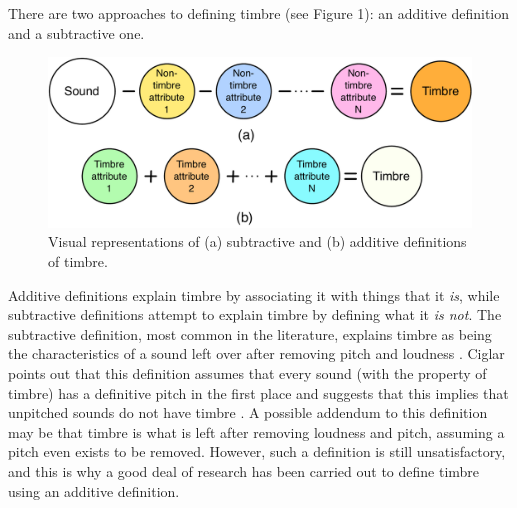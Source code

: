 \documentclass[12pt]{report} 	%
\numberwithin{figure}{chapter}
\numberwithin{table}{chapter}
\numberwithin{equation}{chapter}
\begin{document}
\begin{flushleft}
There are two approaches to defining timbre (see Figure 1): an additive definition and a subtractive one. 
\begin{figure}[!htp]
\begin{center}
\includegraphics[scale=0.45]{SubtractiveVsAdditive}
\caption[Subtractive vs. additive timbre definitions]{Visual representations of (a) subtractive and (b) additive definitions of timbre.}
\end{center}
\vspace{6pt}
\end{figure}
Additive definitions explain timbre by associating it with things that it \textit{is}, while subtractive definitions attempt to explain timbre by defining what it \textit{is not}. The subtractive definition, most common in the literature, explains timbre as being the characteristics of a sound left over after removing pitch and loudness \cite[p. 45]{Wessel:1979tg} \cite[p. 225]{Toiviainen:1998hs}. Ciglar points out that this definition assumes that every sound (with the property of timbre) has a definitive pitch in the first place and suggests that this implies that unpitched sounds do not have timbre \cite[p. 7]{Ciglar:2009uf}. A possible addendum to this definition may be that timbre is what is left after removing loudness and pitch, assuming a pitch even exists to be removed. However, such a definition is still unsatisfactory, and this is why a good deal of research has been carried out to define timbre using an additive definition.


\end{flushleft}
\end{document}
